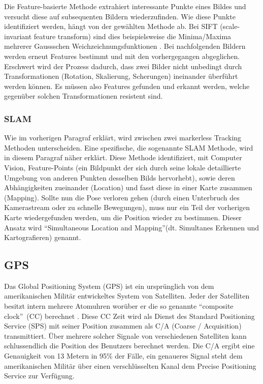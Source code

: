 \documentclass[a4paper]{scrreprt}
\begin{document}
Die Feature-basierte Methode extrahiert interessante Punkte eines Bildes und versucht diese auf subsequenten Bildern wiederzufinden. Wie diese Punkte identifiziert werden, hängt von der gewählten Methode ab. Bei SIFT (scale-invariant feature transform) sind dies beispielsweise die Minima/Maxima mehrerer Gaussschen Weichzeichnungsfunktionen \parencite{Lowe1999}. Bei nachfolgenden Bildern werden erneut Features bestimmt und mit den vorhergegangen abgeglichen. Erschwert wird der Prozess dadurch, dass zwei Bilder nicht unbedingt durch Transformationen (Rotation, Skalierung, Scherungen) ineinander überführt werden können. Es müssen also Features gefunden und erkannt werden, welche gegenüber solchen Transformationen resistent sind.

\subsubsection{SLAM}
Wie im vorherigen Paragraf erklärt, wird zwischen zwei markerless Tracking Methoden unterscheiden. Eine spezifische, die sogenannte SLAM Methode, wird in diesem Paragraf näher erklärt. Diese Methode identifiziert, mit Computer Vision, Feature-Points (ein Bildpunkt der sich durch seine lokale detaillierte Umgebung von anderen Punkten desselben Bilds hervorhebt), sowie deren Abhängigkeiten zueinander (Location) und fasst diese in einer Karte zusammen (Mapping). Sollte nun die Pose verloren gehen (durch einen Unterbruch des Kamerastream oder zu schnelle Bewegungen), muss nur ein Teil der vorherigen Karte wiedergefunden werden, um die Position wieder zu bestimmen. Dieser Ansatz wird \textquotedblleft Simultaneous Location and Mapping\textquotedblright (dt. Simultanes Erkennen und Kartografieren) genannt.

\subsection{GPS}
Das Global Positioning System (GPS) ist ein ursprünglich von dem amerikanischen Militär entwickeltes System von Satelliten. Jeder der Satelliten besitzt intern mehrere Atomuhren worüber er die so genannte \textquotedblleft composite clock\textquotedblright\ (CC) berechnet \parencite{GPSSysDesc2009}. Diese CC Zeit wird als Dienst des Standard Positioning Service (SPS) mit seiner Position zusammen als C/A (Coarse / Acquisition) transmittiert. Über mehrere solcher Signale von verschiedenen Satelliten kann schlussendlich die Position des Benutzers berechnet werden. Die C/A ergibt eine Genauigkeit von 13 Metern in 95\% der Fälle, ein genaueres Signal steht dem amerikanischen Militär über einen verschlüsselten Kanal dem Precise Positioning Service zur Verfügung.
\end{document}
